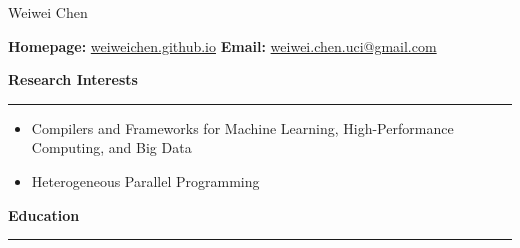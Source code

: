\documentclass[10pt,A4]{article}
\newcommand{\cvsection}[1]
{
	\begin{flushleft}
  \LARGE\textcolor{sectcol}{\textbf{  #1}}
	\end{flushleft}
  \vspace{-15pt}
  \textcolor{softcol}{\hrule}
  \vspace{8pt}
}
\newcommand{\metasection}[3]
{
\small{#1} \hspace*{\fill} \small{#2}\hspace*{\fill} \small{#3}\\[1pt]
}
\begin{document}
\vspace{-8pt}
\begin{center}
	\HUGE Weiwei Chen
\end{center}

\vspace{6pt}


\metasection{\textbf{Homepage:} \href{https://weiweichen.github.io}{weiweichen.github.io}}{\textbf{Email:} \href{mailto:weiwei.chen.uci@gmail.com}{weiwei.chen.uci@gmail.com}}
{\textbf{} }
\vspace{-2pt}
\vspace{6pt}

\normalsize

\vspace{-6pt}
\cvsection{Research Interests}

\vspace{-4pt}
\begin{itemize}[leftmargin=*]
 \setlength\itemsep{-0.5cm}
  \item Compilers and Frameworks for Machine Learning, High-Performance Computing, and Big Data \\
  \item Heterogeneous Parallel Programming
\end{itemize}
\vspace{8pt}

%
%

\vspace{-12pt}
\cvsection{Education}
\end{document}
